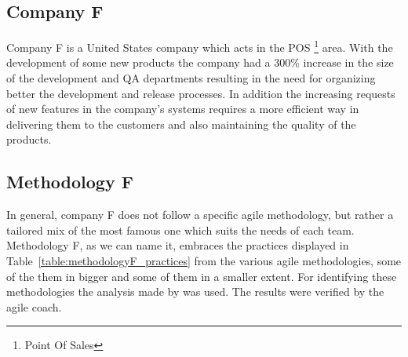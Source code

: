 \subsection{Company F}
Company F is a United States company which acts in the POS \footnote{Point Of Sales} area. With the development of some new products the company had a 300\% increase in the size of the development and QA departments resulting in the need for organizing better the development and release processes. In addition the increasing requests of new features in the company's systems requires a more efficient way in delivering them to the customers and also maintaining the quality of the products.

\subsection{Methodology F}
In general, company F does not follow a specific agile methodology, but rather a tailored mix of the most famous one which suits the needs of each team. Methodology F, as we can name it, embraces the practices displayed in Table~\ref{table:methodologyF_practices} from the various agile methodologies, some of the them in bigger and some of them in a smaller extent. For identifying these methodologies the analysis made by \citet{koch2005agile} was used. The results were verified by the agile coach.

